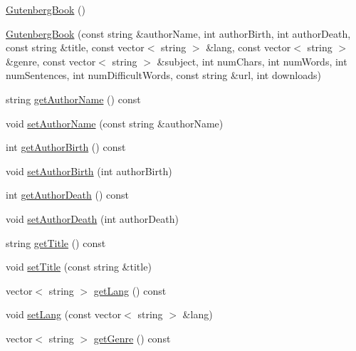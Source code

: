 \begin{DoxyCompactItemize}
\item 
\mbox{\hyperlink{classbridges_1_1_gutenberg_book_a289c167dd11eed17cce39a59931f246c}{Gutenberg\+Book}} ()
\item 
\mbox{\hyperlink{classbridges_1_1_gutenberg_book_a9674a4cf8fa7cd35e640757261376793}{Gutenberg\+Book}} (const string \&author\+Name, int author\+Birth, int author\+Death, const string \&title, const vector$<$ string $>$ \&lang, const vector$<$ string $>$ \&genre, const vector$<$ string $>$ \&subject, int num\+Chars, int num\+Words, int num\+Sentences, int num\+Difficult\+Words, const string \&url, int downloads)
\item 
string \mbox{\hyperlink{classbridges_1_1_gutenberg_book_a2eb2aa2898530c387855572132598821}{get\+Author\+Name}} () const
\item 
void \mbox{\hyperlink{classbridges_1_1_gutenberg_book_a40f8b184834c2cf816e3c06d6c6ca3f3}{set\+Author\+Name}} (const string \&author\+Name)
\item 
int \mbox{\hyperlink{classbridges_1_1_gutenberg_book_a044cf5c0a7d96c2f9f529889feab2b14}{get\+Author\+Birth}} () const
\item 
void \mbox{\hyperlink{classbridges_1_1_gutenberg_book_a33ac2e6063319064006fa72b6fcfb0dc}{set\+Author\+Birth}} (int author\+Birth)
\item 
int \mbox{\hyperlink{classbridges_1_1_gutenberg_book_a6734c90974aba4346a11f2712d92d9b2}{get\+Author\+Death}} () const
\item 
void \mbox{\hyperlink{classbridges_1_1_gutenberg_book_acf1e81a3b635fb939bc6af772a61fd3c}{set\+Author\+Death}} (int author\+Death)
\item 
string \mbox{\hyperlink{classbridges_1_1_gutenberg_book_a4dbf4c332b0fe74326d37610f28761be}{get\+Title}} () const
\item 
void \mbox{\hyperlink{classbridges_1_1_gutenberg_book_a60968066e63898da03ae0a3b5741f19d}{set\+Title}} (const string \&title)
\item 
vector$<$ string $>$ \mbox{\hyperlink{classbridges_1_1_gutenberg_book_ae5165a13385e0caacecfa26820e5143e}{get\+Lang}} () const
\item 
void \mbox{\hyperlink{classbridges_1_1_gutenberg_book_ab02303890adf0fc6ee8fc736c4a603c3}{set\+Lang}} (const vector$<$ string $>$ \&lang)
\item 
vector$<$ string $>$ \mbox{\hyperlink{classbridges_1_1_gutenberg_book_aa64f1dbef6b1c0e11755d78e827a9372}{get\+Genre}} () const
\item 

\end{DoxyCompactItemize}

